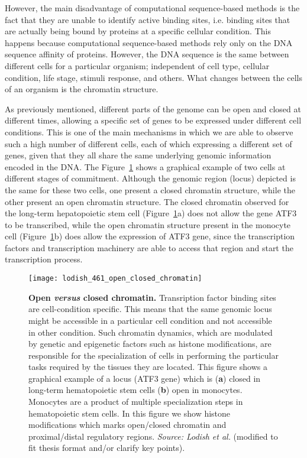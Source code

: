 However, the main disadvantage of computational sequence-based methods is the fact that they are unable to identify active binding sites, i.e. binding sites that are actually being bound by proteins at a specific cellular condition. This happens because computational sequence-based methods rely only on the DNA sequence affinity of proteins. However, the DNA sequence is the same between different cells for a particular organism; independent of cell type, cellular condition, life stage, stimuli response, and others. What changes between the cells of an organism is the chromatin structure.

As previously mentioned, different parts of the genome can be open and closed at different times, allowing a specific set of genes to be expressed under different cell conditions. This is one of the main mechanisms in which we are able to observe such a high number of different cells, each of which expressing a different set of genes, given that they all share the same underlying genomic information encoded in the DNA. The Figure~\ref{fig:lodish_open_closed_chromatin} shows a graphical example of two cells at different stages of commitment. Although the genomic region (locus) depicted is the same for these two cells, one present a closed chromatin structure, while the other present an open chromatin structure. The closed chromatin observed for the long-term hepatopoietic stem cell (Figure~\ref{fig:lodish_open_closed_chromatin}a) does not allow the gene ATF3 to be transcribed, while the open chromatin structure present in the monocyte cell (Figure~\ref{fig:lodish_open_closed_chromatin}b) does allow the expression of ATF3 gene, since the transcription factors and transcription machinery are able to access that region and start the transcription process.

\begin{figure}[h!]
\centering
\texttt{[image: lodish\_461\_open\_closed\_chromatin]}
\caption[Open \emph{versus} closed chromatin]{\textbf{Open \emph{versus} closed chromatin.} Transription factor binding sites are cell-condition specific. This means that the same genomic locus might be accessible in a particular cell condition and not accessible in other condition. Such chromatin dynamics, which are modulated by genetic and epigenetic factors such as histone modifications, are responsible for the specialization of cells in performing the particular tasks required by the tissues they are located. This figure shows a graphical example of a locus (ATF3 gene) which is (\textbf{a}) closed in long-term hematopoietic stem cells (\textbf{b}) open in monocytes. Monocytes are a product of multiple specialization steps in hematopoietic stem cells. In this figure we show histone modifications which marks open/closed chromatin and proximal/distal regulatory regions. \emph{Source: Lodish et al.}\cite{lodish2007} (modified to fit thesis format and/or clarify key points).}
\label{fig:lodish_open_closed_chromatin}
\end{figure}

